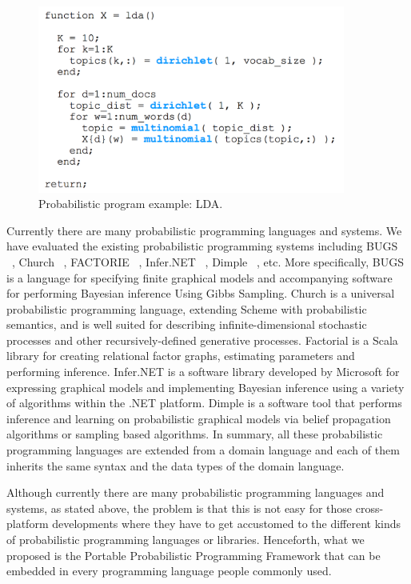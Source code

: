 \begin{figure}
    \centering
    \includegraphics[width=0.9\textwidth]{figures/lda_eg.png}
    \caption{Probabilistic program example: LDA.}
    \label{fig:lda}
\end{figure}

Currently there are many probabilistic programming languages and systems. We have evaluated the existing probabilistic programming systems including BUGS ~\cite{bugs}, Church ~\cite{church}, FACTORIE ~\cite{factorie}, Infer.NET ~\cite{infernet}, Dimple ~\cite{dimple}, etc. More specifically, BUGS is a language for specifying finite graphical models and accompanying software for performing Bayesian inference Using Gibbs Sampling. Church is a universal probabilistic programming language, extending Scheme with probabilistic semantics, and is well suited for describing infinite-dimensional stochastic processes and other recursively-defined generative processes. Factorial is a Scala library for creating relational factor graphs, estimating parameters and performing inference. Infer.NET is a software library developed by Microsoft for expressing graphical models and implementing Bayesian inference using a variety of algorithms within the .NET platform. Dimple is a software tool that performs inference and learning on probabilistic graphical models via belief propagation algorithms or sampling based algorithms. In summary, all these probabilistic programming languages are extended from a domain language and each of them inherits the same syntax and the data types of the domain language. 

Although currently there are many probabilistic programming languages and systems, as stated above, the problem is that this is not easy for those cross-platform developments where they have to get accustomed to the different kinds of probabilistic programming languages or libraries. Henceforth, what we proposed is the Portable Probabilistic Programming Framework that can be embedded in every programming language people commonly used.

